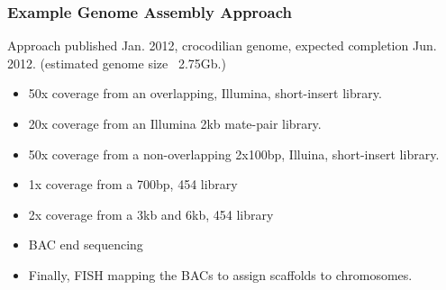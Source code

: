 \documentclass[pdf]{beamer}
\begin{document}
\begin{frame}
\frametitle{Example Genome Assembly Approach}
Approach published Jan. 2012, crocodilian genome, expected completion Jun. 2012. (estimated genome size ~2.75Gb.) 
\begin{itemize}
\item 50x coverage from an overlapping, Illumina, short-insert library.
\item 20x coverage from an Illumina 2kb mate-pair library.
\item 50x coverage from a non-overlapping 2x100bp, Illuina, short-insert library.
\item 1x coverage from a 700bp, 454 library
\item 2x coverage from a 3kb and 6kb, 454 library
\item BAC end sequencing
\item Finally, FISH mapping the BACs to assign scaffolds to chromosomes.
\end{itemize}
\end{frame}
\end{document}
